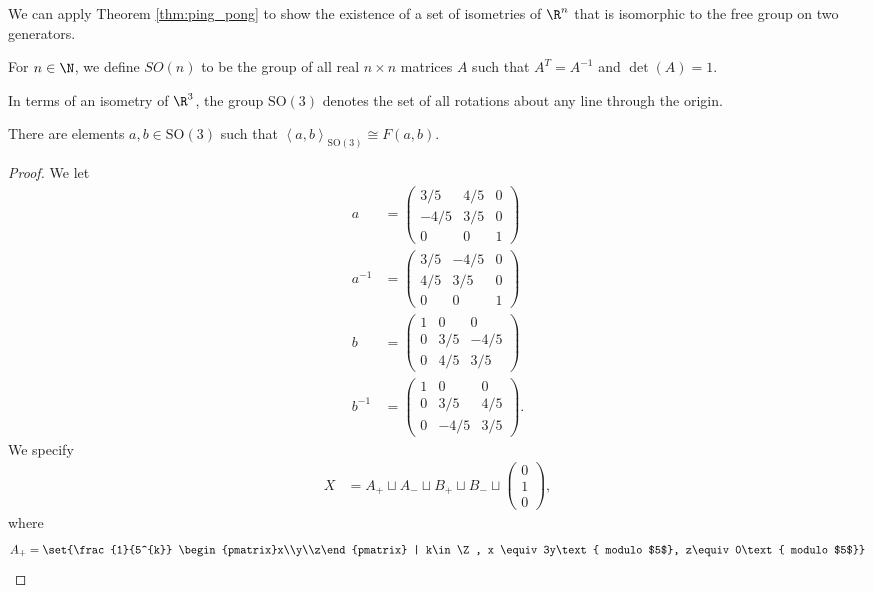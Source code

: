 We can apply Theorem \ref{thm:ping_pong} to show the existence of a set of isometries of $\R^n$ that is isomorphic to the free group on two generators.
\begin{definition}
  For $n\in \N$, we define $SO(n)$ to be the group of all real $n\times n$ matrices $A$ such that $A^{T} = A^{-1}$ and $\det(A) = 1$.
\end{definition}
In terms of an isometry of $\R^3$, the group $\text{SO}(3)$ denotes the set of all rotations about any line through the origin.
\begin{theorem}
  There are elements $a,b\in \text{SO}(3)$ such that $\left\langle a,b \right\rangle_{\text{SO}(3)} \cong F(a,b)$.\label{thm:free_group_so3}
\end{theorem}
\begin{proof}
  We let
  \begin{align*}
    a &= \begin{pmatrix}3/5 & 4/5 & 0 \\ -4/5 & 3/5 & 0 \\ 0 & 0 & 1\end{pmatrix}\\
    a^{-1} &= \begin{pmatrix}3/5 & -4/5 & 0 \\ 4/5 & 3/5 & 0 \\ 0 & 0 & 1\end{pmatrix}\\
    b &= \begin{pmatrix}1 & 0 & 0 \\ 0 & 3/5 & -4/5 \\ 0 & 4/5 & 3/5\end{pmatrix}\\
    b^{-1} &= \begin{pmatrix}1 & 0 & 0 \\ 0 & 3/5 & 4/5 \\ 0 & -4/5 & 3/5\end{pmatrix}.
  \end{align*}
  We specify
  \begin{align*}
    X &= A_{+} \sqcup A_{-} \sqcup B_{+} \sqcup B_{-} \sqcup \begin{pmatrix}0\\1\\0\end{pmatrix},
  \end{align*}
  where
  \begin{align*}
    A_{+} &= \set{\frac{1}{5^{k}} \begin{pmatrix}x\\y\\z\end{pmatrix} | k\in \Z, x \equiv 3y\text{ modulo $5$}, z\equiv0\text{ modulo $5$}}\\

\end{align*}
\end{proof}
